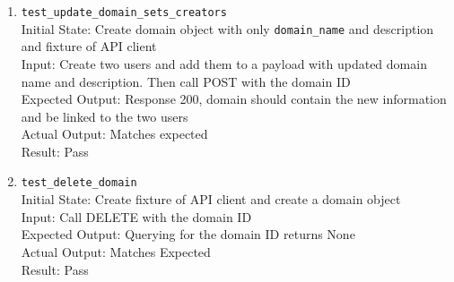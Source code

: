 \documentclass[12pt, titlepage]{article}
\begin{document}
\begin{enumerate}
      \\Result: Pass
    \item \texttt{test\_update\_domain\_sets\_creators} \label{test-update-domain-sets-creators}
      \\Initial State: Create domain object with only \texttt{domain\_name} and description and fixture of API client
      \\Input: Create two users and add them to a payload with updated domain name and description. Then call POST with the domain ID
      \\Expected Output: Response 200, domain should contain the new information and be linked to the two users
      \\Actual Output: Matches expected
      \\Result: Pass
    \item \texttt{test\_delete\_domain} \label{test-delete-domain}
      \\Initial State: Create fixture of API client and create a domain object
      \\Input: Call DELETE with the domain ID
      \\Expected Output: Querying for the domain ID returns None
      \\Actual Output: Matches Expected
      \\Result: Pass
  \end{enumerate}
\end{document}
